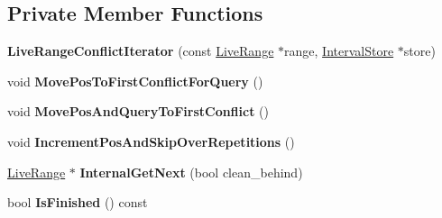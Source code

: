 \subsection*{Private Member Functions}
\begin{DoxyCompactItemize}
\item 
{\bfseries Live\+Range\+Conflict\+Iterator} (const \hyperlink{classv8_1_1internal_1_1compiler_1_1_live_range}{Live\+Range} $\ast$range, \hyperlink{classv8_1_1internal_1_1_zone_set}{Interval\+Store} $\ast$store)\hypertarget{classv8_1_1internal_1_1compiler_1_1_live_range_conflict_iterator_a7b245b0861b92392e0222a0a32cf0264}{}\label{classv8_1_1internal_1_1compiler_1_1_live_range_conflict_iterator_a7b245b0861b92392e0222a0a32cf0264}

\item 
void {\bfseries Move\+Pos\+To\+First\+Conflict\+For\+Query} ()\hypertarget{classv8_1_1internal_1_1compiler_1_1_live_range_conflict_iterator_ac52cbf972a07be2c6661064770b359cf}{}\label{classv8_1_1internal_1_1compiler_1_1_live_range_conflict_iterator_ac52cbf972a07be2c6661064770b359cf}

\item 
void {\bfseries Move\+Pos\+And\+Query\+To\+First\+Conflict} ()\hypertarget{classv8_1_1internal_1_1compiler_1_1_live_range_conflict_iterator_a7f672c3dcebb403155e411b653c896c4}{}\label{classv8_1_1internal_1_1compiler_1_1_live_range_conflict_iterator_a7f672c3dcebb403155e411b653c896c4}

\item 
void {\bfseries Increment\+Pos\+And\+Skip\+Over\+Repetitions} ()\hypertarget{classv8_1_1internal_1_1compiler_1_1_live_range_conflict_iterator_a8dd27b0194182bbd64d5d22c59504e1a}{}\label{classv8_1_1internal_1_1compiler_1_1_live_range_conflict_iterator_a8dd27b0194182bbd64d5d22c59504e1a}

\item 
\hyperlink{classv8_1_1internal_1_1compiler_1_1_live_range}{Live\+Range} $\ast$ {\bfseries Internal\+Get\+Next} (bool clean\+\_\+behind)\hypertarget{classv8_1_1internal_1_1compiler_1_1_live_range_conflict_iterator_a39cc0e752aa5d49b0c3a84359b694e50}{}\label{classv8_1_1internal_1_1compiler_1_1_live_range_conflict_iterator_a39cc0e752aa5d49b0c3a84359b694e50}

\item 
bool {\bfseries Is\+Finished} () const \hypertarget{classv8_1_1internal_1_1compiler_1_1_live_range_conflict_iterator_a3b126ff0a0e2d51b302be694b57ef5a7}{}\label{classv8_1_1internal_1_1compiler_1_1_live_range_conflict_iterator_a3b126ff0a0e2d51b302be694b57ef5a7}


\end{DoxyCompactItemize}
